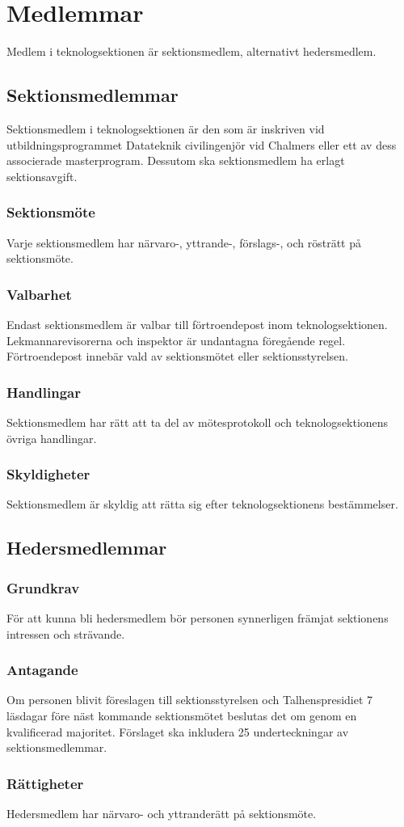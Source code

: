 \section{Medlemmar}
\label{sec:medlemmar}
Medlem i teknologsektionen är sektionsmedlem, alternativt hedersmedlem.
\subsection{Sektionsmedlemmar}
Sektionsmedlem i teknologsektionen är den som är inskriven vid utbildningsprogrammet Datateknik civilingenjör vid Chalmers eller ett av dess associerade masterprogram. Dessutom ska sektionsmedlem ha erlagt sektionsavgift.
\subsubsection{Sektionsmöte}
Varje sektionsmedlem har närvaro-, yttrande-, förslags-, och rösträtt på sektionsmöte.
\subsubsection{Valbarhet}
\label{sec:medlemmar_valbarhet}
Endast sektionsmedlem är valbar till förtroendepost inom teknologsektionen. Lekmannarevisorerna och inspektor är undantagna föregående regel. Förtroendepost innebär vald av sektionsmötet eller sektionsstyrelsen.
\subsubsection{Handlingar}
Sektionsmedlem har rätt att ta del av mötesprotokoll och teknologsektionens övriga handlingar.
\subsubsection{Skyldigheter}
Sektionsmedlem är skyldig att rätta sig efter teknologsektionens bestämmelser.
\subsection{Hedersmedlemmar}
\subsubsection{Grundkrav}
För att kunna bli hedersmedlem bör personen synnerligen främjat sektionens intressen och strävande.
\subsubsection{Antagande}
Om personen blivit föreslagen till sektionsstyrelsen och Talhenspresidiet 7 läsdagar före näst kommande sektionsmötet beslutas det om genom en kvalificerad majoritet.
Förslaget ska inkludera 25 underteckningar av sektionsmedlemmar.
\subsubsection{Rättigheter}
Hedersmedlem har närvaro- och yttranderätt på sektionsmöte.

